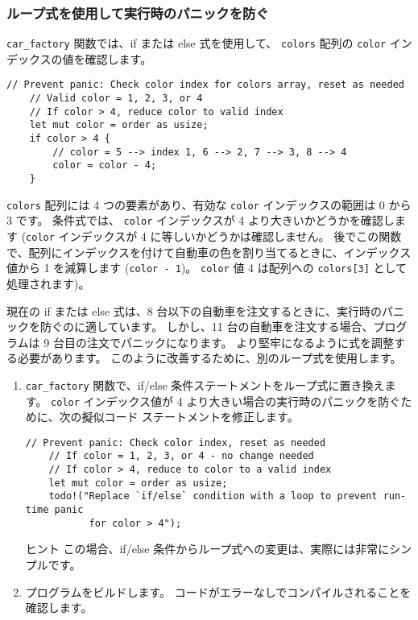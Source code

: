 \subsubsection{ループ式を使用して実行時のパニックを防ぐ}

\texttt{car\_factory} 関数では、if または else 式を使用して、 \texttt{colors} 配列の \texttt{color} インデックスの値を確認します。


\begin{lstlisting}[numbers=none]
    // Prevent panic: Check color index for colors array, reset as needed
    // Valid color = 1, 2, 3, or 4
    // If color > 4, reduce color to valid index
    let mut color = order as usize;
    if color > 4 {        
        // color = 5 --> index 1, 6 --> 2, 7 --> 3, 8 --> 4
        color = color - 4;
    }
\end{lstlisting}

\texttt{colors} 配列には 4 つの要素があり、有効な \texttt{color} インデックスの範囲は 0 から 3 です。 条件式では、 \texttt{color} インデックスが 4 より大きいかどうかを確認します (\texttt{color} インデックスが 4 に等しいかどうかは確認しません。 後でこの関数で、配列にインデックスを付けて自動車の色を割り当てるときに、インデックス値から 1 を減算します (\texttt{color - 1})。 \texttt{color} 値 4 は配列への \texttt{colors[3]} として処理されます)。

現在の if または else 式は、8 台以下の自動車を注文するときに、実行時のパニックを防ぐのに適しています。 しかし、11 台の自動車を注文する場合、プログラムは 9 台目の注文でパニックになります。 より堅牢になるように式を調整する必要があります。 このように改善するために、別のループ式を使用します。

\begin{enumerate}

\item \texttt{car\_factory} 関数で、if/else 条件ステートメントをループ式に置き換えます。 \texttt{color} インデックス値が 4 より大きい場合の実行時のパニックを防ぐために、次の擬似コード ステートメントを修正します。

\begin{lstlisting}[numbers=none]
    // Prevent panic: Check color index, reset as needed
    // If color = 1, 2, 3, or 4 - no change needed
    // If color > 4, reduce to color to a valid index
    let mut color = order as usize;
    todo!("Replace `if/else` condition with a loop to prevent run-time panic
           for color > 4");
\end{lstlisting}

\begin{itembox}[l]{ヒント}
この場合、if/else 条件からループ式への変更は、実際には非常にシンプルです。
\end{itembox}

\item プログラムをビルドします。 コードがエラーなしでコンパイルされることを確認します。

\end{enumerate}

